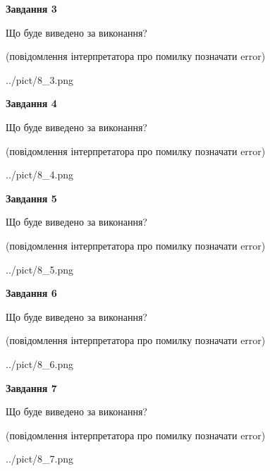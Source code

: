 \documentclass[12pt, ukrainian]{article}
\begin{document}
{\begin {large}
{\begin {center}\textbf{Завдання 3}\end {center}}\par
Що буде виведено за виконання?\par
 (повідомлення інтерпретатора про помилку позначати error)\par
\begin{center}
	{../pict/8_3.png}
\end{center}
\newpage

{\begin {center}\textbf{Завдання 4}\end {center}}\par
Що буде виведено за виконання?\par
 (повідомлення інтерпретатора про помилку позначати error)\par
\begin{center}
	{../pict/8_4.png}
\end{center}
\newpage

{\begin {center}\textbf{Завдання 5}\end {center}}\par
Що буде виведено за виконання?\par
 (повідомлення інтерпретатора про помилку позначати error)\par
\begin{center}
	{../pict/8_5.png}
\end{center}
\newpage

{\begin {center}\textbf{Завдання 6}\end {center}}\par
Що буде виведено за виконання?\par
 (повідомлення інтерпретатора про помилку позначати error)\par
\begin{center}
	{../pict/8_6.png}
\end{center}
\newpage

{\begin {center}\textbf{Завдання 7}\end {center}}\par
Що буде виведено за виконання?\par
 (повідомлення інтерпретатора про помилку позначати error)\par
\begin{center}
	{../pict/8_7.png}
\end{center}
\newpage


\end{large}}
\end{document}
